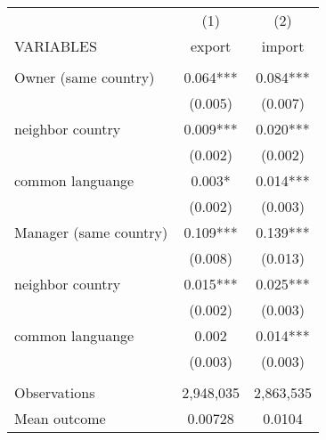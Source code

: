\begin{tabular}{lcc} \hline
 & (1) & (2) \\
VARIABLES & export & import \\ \hline
 &  &  \\
Owner (same country) & 0.064*** & 0.084*** \\
 & (0.005) & (0.007) \\
neighbor country & 0.009*** & 0.020*** \\
 & (0.002) & (0.002) \\
common languange & 0.003* & 0.014*** \\
 & (0.002) & (0.003) \\
Manager (same country) & 0.109*** & 0.139*** \\
 & (0.008) & (0.013) \\
neighbor country & 0.015*** & 0.025*** \\
 & (0.002) & (0.003) \\
common languange & 0.002 & 0.014*** \\
 & (0.003) & (0.003) \\
 &  &  \\
Observations & 2,948,035 & 2,863,535 \\
 Mean outcome & 0.00728 & 0.0104 \\ \hline
\end{tabular}
